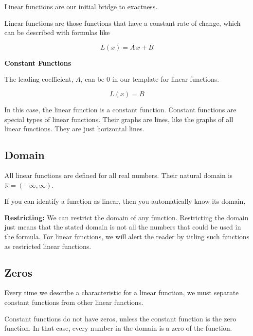 \documentclass{ximera}
\begin{document}
Linear functions are our initial bridge to exactness. 


Linear functions are those functions that have a constant rate of change, which can be described with formulas like

\[
L(x) = A \, x + B 
\]



\begin{warning} \textbf{\textcolor{red!70!black}{Constant Functions}}

The leading coefficient, $A$, can be $0$ in our template for linear functions. 

\[
L(x) = B 
\]

In this case, the linear function is a constant function.  Constant functions are special types of linear functions. Their graphs are lines, like the graphs of all linear functions.  They are just horizontal lines.

\end{warning}




\subsection*{Domain} 

All linear functions are defined for all real numbers.  Their natural domain is $\mathbb{R} = (-\infty, \infty)$. 

If you can identify a function as linear, then you automatically know its domain. 


\textbf{Restricting:}  We can restrict the domain of any function.  Restricting the domain just means that the stated domain is not all the numbers that could be used in the formula.  For linear functions, we will alert the reader by titling such functions as restricted linear functions.







\subsection*{Zeros}

Every time we describe a characteristic for a linear function, we must separate constant functions from other linear functions. 

Constant functions do not have zeros, unless the constant function is the zero function.  In that case, every number in the domain is a zero of the function. 
\end{document}

